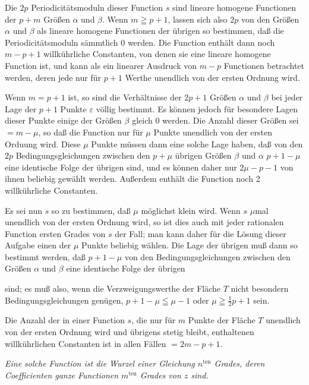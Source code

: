 \documentclass{article}
\begin{document}
Die $2p$ Periodicitätsmoduln dieser Function $s$ sind lineare homogene Functionen der $p+m$ Größen $\alpha$ und $\beta$. Wenn $m \geqq p+1$, lassen sich also $2p$ von den Größen $\alpha$ und $\beta$ als lineare homogene Functionen der übrigen so bestimmen, daß die Periodicitätsmoduln sämmtlich 0 werden. Die Function enthält dann noch $m-p+1$ willkührliche Constanten, von denen sie eine lineare homogene Function ist, und kann als ein linearer Ausdruck von $m-p$ Functionen betrachtet werden, deren jede nur für $p+1$ Werthe unendlich von der ersten Ordnung wird.

Wenn $m = p+1$ ist, so sind die Verhältnisse der $2p+1$ Größen $\alpha$ und $\beta$ bei jeder Lage der $p+1$ Punkte $\varepsilon$ völlig bestimmt. Es können jedoch für besondere Lagen dieser Punkte einige der Größen $\beta$ gleich 0 werden. Die Anzahl dieser Größen sei $= m-\mu$, so daß die Function nur für $\mu$ Punkte unendlich von der ersten Orduung wird. Diese $\mu$ Punkte müssen dann eine solche Lage haben, daß von den $2p$ Bedingungsgleichungen zwischen den $p+\mu$ übrigen Größen $\beta$ und $\alpha$ $p+1-\mu$ eine identische Folge der übrigen sind, und es können daher nur $2\mu-p-1$ von ihnen beliebig gewählt werden. Außerdem enthält die Function noch 2 willkührliche Constanten.

Es sei nun $s$ so zu bestimmen, daß $\mu$ möglichst klein wird. Wenn $s$ $\mu$mal unendlich von der ersten Ordnung wird, so ist dies auch mit jeder rationalen Function ersten Grades von $s$ der Fall; man kann daher für die Lösung dieser Aufgabe einen der $\mu$ Punkte beliebig wählen. Die Lage der übrigen muß dann so bestimmt werden, daß $p+1-\mu$ von den Bedingungsgleichungen zwischen den Größen $\alpha$ und $\beta$ eine identische Folge der übrigen

sind; es muß also, wenn die Verzweigungswerthe der Fläche $T$ nicht besondern Bedingungsgleichungen genügen, $p+1-\mu \leqq \mu-1$ oder $\mu \geqq \frac{1}{2}p+1$ sein.

Die Anzahl der in einer Function $s$, die nur für $m$ Punkte der Fläche $T$ unendlich von der ersten Ordnung wird und übrigens stetig bleibt, enthaltenen willkührlichen Constanten ist in allen Fällen $= 2m-p+1$.

\emph{Eine solche Function ist die Wurzel einer Gleichung $n^{\text{ten}}$ Grades, deren Coefficienten ganze Functionen $m^{\text{ten}}$ Grades von $z$ sind.}
\end{document}
